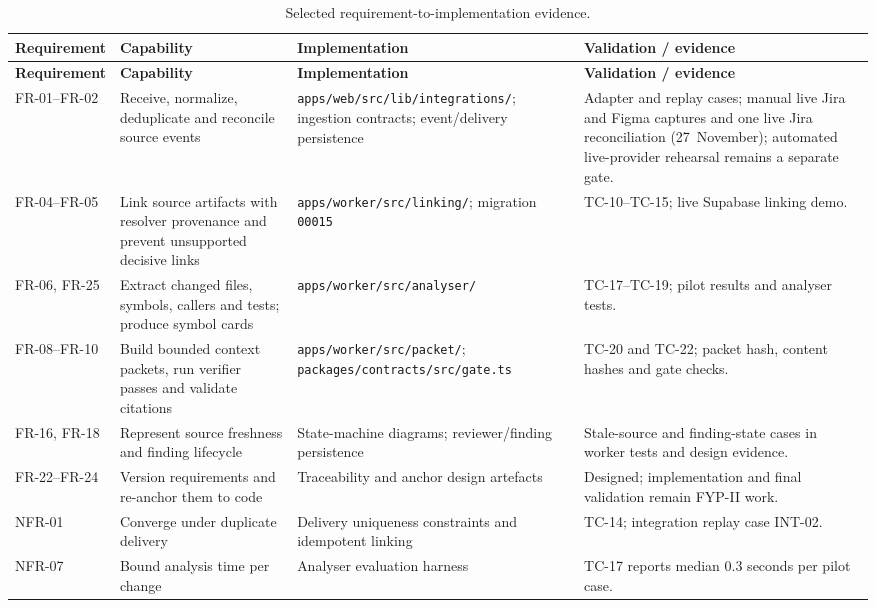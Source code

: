 \begin{longtable}{>{\raggedright\arraybackslash}p{}>{\raggedright\arraybackslash}p{}>{\raggedright\arraybackslash}p{}>{\raggedright\arraybackslash}p{}}
\caption{Selected requirement-to-implementation evidence.}\label{tab:appendix-requirements}\\
\toprule
\textbf{Requirement} & \textbf{Capability} & \textbf{Implementation} & \textbf{Validation / evidence}\\
\midrule
\endfirsthead
\toprule
\textbf{Requirement} & \textbf{Capability} & \textbf{Implementation} & \textbf{Validation / evidence}\\
\midrule
\endhead
FR-01--FR-02 & Receive, normalize, deduplicate and reconcile source events & \texttt{apps/web/src/lib/integrations/}; ingestion contracts; event/delivery persistence & Adapter and replay cases; manual live Jira and Figma captures and one live Jira reconciliation (27~November); automated live-provider rehearsal remains a separate gate.\\
FR-04--FR-05 & Link source artifacts with resolver provenance and prevent unsupported decisive links & \texttt{apps/worker/src/linking/}; migration \texttt{00015} & TC-10--TC-15; live Supabase linking demo.\\
FR-06, FR-25 & Extract changed files, symbols, callers and tests; produce symbol cards & \texttt{apps/worker/src/analyser/} & TC-17--TC-19; pilot results and analyser tests.\\
FR-08--FR-10 & Build bounded context packets, run verifier passes and validate citations & \texttt{apps/worker/src/packet/}; \texttt{packages/contracts/src/gate.ts} & TC-20 and TC-22; packet hash, content hashes and gate checks.\\
FR-16, FR-18 & Represent source freshness and finding lifecycle & State-machine diagrams; reviewer/finding persistence & Stale-source and finding-state cases in worker tests and design evidence.\\
FR-22--FR-24 & Version requirements and re-anchor them to code & Traceability and anchor design artefacts & Designed; implementation and final validation remain FYP-II work.\\
NFR-01 & Converge under duplicate delivery & Delivery uniqueness constraints and idempotent linking & TC-14; integration replay case INT-02.\\
NFR-07 & Bound analysis time per change & Analyser evaluation harness & TC-17 reports median 0.3 seconds per pilot case.\\
\bottomrule
\end{longtable}
